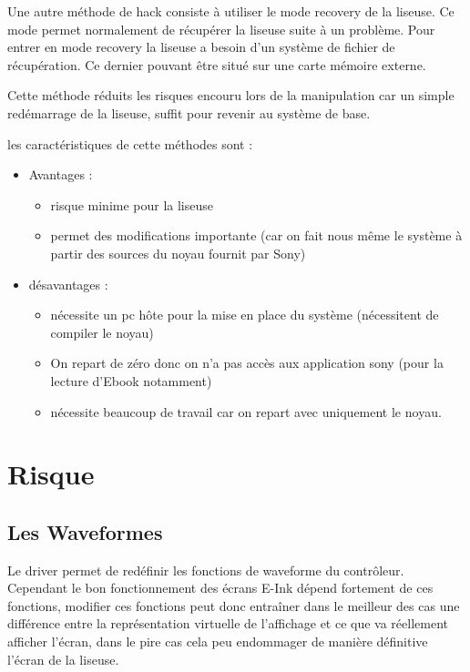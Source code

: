 Une autre méthode de hack consiste à utiliser le mode recovery de la liseuse.
Ce mode permet normalement de récupérer la liseuse suite à un problème.
Pour entrer en mode recovery la liseuse a besoin d'un  système de fichier de récupération.
Ce dernier pouvant être situé sur une carte mémoire externe.

Cette méthode réduits les risques encouru lors de la manipulation car un simple redémarrage de la liseuse, 
suffit pour revenir au système de base.

les caractéristiques de cette méthodes sont  : 
\begin{itemize}
	\renewcommand{\labelitemi}{$\bullet$}
	\item Avantages : 
	\begin{itemize}
		\item risque minime pour la liseuse
		\item permet des modifications importante (car on fait nous même le système à partir des sources du noyau fournit par Sony)%
	\end{itemize}
	\item désavantages : 
		\begin{itemize}
			\item nécessite un pc hôte pour la mise en place du système (nécessitent de compiler le noyau)
			\item On repart de zéro donc on n'a pas accès aux application sony (pour la lecture d'Ebook notamment)
			\item nécessite beaucoup de travail car on repart avec uniquement le noyau.
		\end{itemize}
\end{itemize}
\section{Risque}
\subsection{Les Waveformes}
	Le driver permet de redéfinir les fonctions de waveforme du contrôleur.
Cependant le bon fonctionnement des écrans E-Ink dépend fortement de ces fonctions, modifier ces fonctions peut donc entraîner dans le meilleur des cas une différence entre la représentation virtuelle de l'affichage et ce que va réellement afficher l'écran, dans le pire cas cela peu endommager de manière définitive l'écran de la liseuse.


